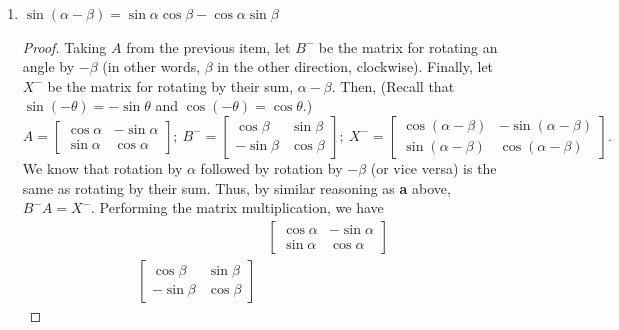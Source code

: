 \documentclass{article}
\begin{document}
\begin{enumerate}
\begin{enumerate}
\begin{proof}
\[\begin{bmatrix}
                \end{bmatrix} = \begin{bmatrix}
                    \cos(\alpha + \beta)&-\sin(\alpha + \beta) \\ \colorbox{Periwinkle!42}{\(\sin(\alpha+\beta)\)}&\cos(\alpha + \beta)
                \end{bmatrix} 
            \] gives us \(\sin(\alpha + \beta) = \sin\alpha\cos\beta + \cos\alpha\sin\beta\), which proves the identity. 
        \end{proof}
        \item \(\sin(\alpha - \beta) = \sin\alpha\cos\beta - \cos\alpha\sin\beta\)\begin{proof}
            Taking \(A\) from the previous item, let \(B^-\) be the matrix for rotating an angle by \(-\beta\) (in other words, \(\beta\) in the other direction, clockwise). Finally, let \(X^-\) be the matrix for rotating by their sum, \(\alpha -\beta\). Then, 
            (Recall that \(\sin(-\theta) = -\sin\theta\) and \(\cos(-\theta) = \cos\theta\).)\[
                A = \begin{bmatrix}
                    \cos\alpha&-\sin\alpha \\ \sin\alpha&\cos\alpha
                \end{bmatrix};~B^- = \begin{bmatrix}
                    \cos\beta&\sin\beta \\ -\sin\beta&\cos\beta
                \end{bmatrix};~X^- =  \begin{bmatrix}
                    \cos(\alpha - \beta)&-\sin(\alpha - \beta) \\ \sin(\alpha-\beta)&\cos(\alpha - \beta)
                \end{bmatrix}.
            \] We know that rotation by \(\alpha\) followed by rotation by \(-\beta\) (or vice versa) is the same as rotating by their sum. Thus, by similar reasoning as \textbf{a} above, \(B^-A = X^-\). Performing the matrix multiplication, we have\begin{align*} 
                &\begin{bmatrix}
                    \cos\alpha&-\sin\alpha \\ \sin\alpha&\cos\alpha
                \end{bmatrix} \\
                \begin{bmatrix}
                    \cos\beta&\sin\beta \\ -\sin\beta&\cos\beta

\end{bmatrix}
\end{align*}
\end{proof}
\end{enumerate}
\end{enumerate}
\end{document}

